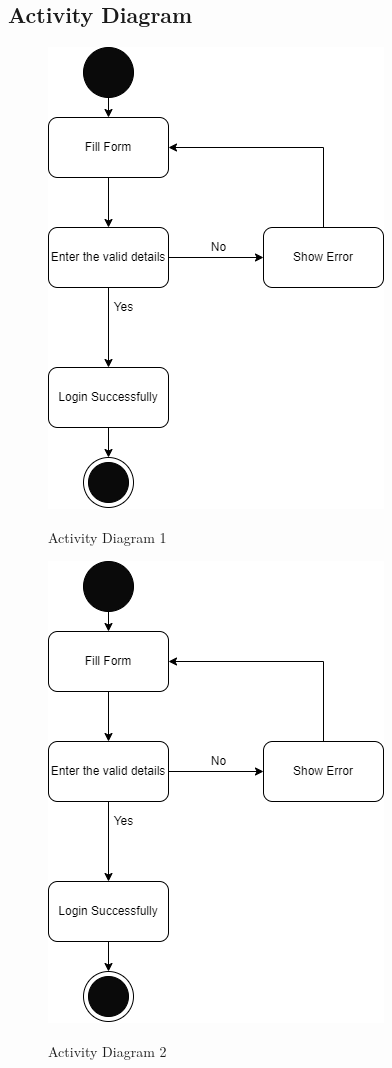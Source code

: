 \subsection{Activity Diagram}

\begin{figure}[H]
    
    \centering
    \caption{Activity Diagram 1}
    \includegraphics[scale=0.5]{./diagrams/Activity Diagram/ad-01.png}
    \label{fig:act-01}

\end{figure}


\begin{figure}[H]
    \centering
    \caption{Activity Diagram 2}
    \includegraphics[scale=0.5]{./diagrams/Activity Diagram/ad-02.png}
    \label{fig:act-02}

\end{figure}


